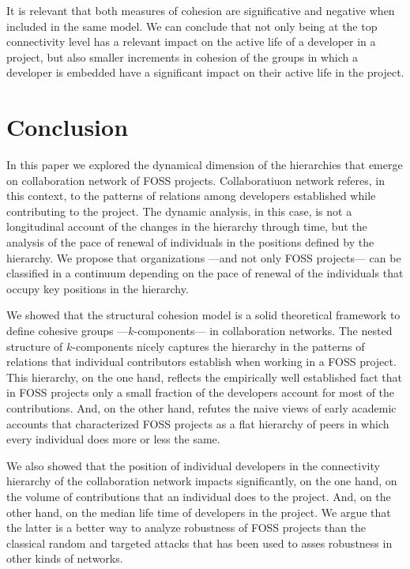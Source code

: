It is relevant that both measures of cohesion are significative and negative when included in the same model. We can conclude that not only being at the top connectivity level has a relevant impact on the active life of a developer in a project, but also smaller increments in cohesion of the groups in which a developer is embedded have a significant impact on their active life in the project.

\section{Conclusion}

In this paper we explored the dynamical dimension of the hierarchies that emerge on collaboration network of FOSS projects. Collaboratiuon network referes, in this context, to the patterns of relations among developers established while contributing to the project. The dynamic analysis, in this case, is not a longitudinal account of the changes in the hierarchy through time, but the analysis of the pace of renewal of individuals in the positions defined by the hierarchy. We propose that organizations ---and not only FOSS projects--- can be classified in a continuum depending on the pace of renewal of the individuals that occupy key positions in the hierarchy.

We showed that the structural cohesion model \citep{white:2001, moody:2003} is a solid theoretical framework to define cohesive groups ---$k$-components--- in collaboration networks. The nested structure of $k$-components nicely captures the hierarchy in the patterns of relations that individual contributors establish when working in a FOSS project. This hierarchy, on the one hand, reflects the empirically well established fact that in FOSS projects only a small fraction of the developers account for most of the contributions. And, on the other hand, refutes the naive views of early academic accounts that characterized FOSS projects as a flat hierarchy of peers in which every individual does more or less the same.

We also showed that the position of individual developers in the connectivity hierarchy of the collaboration network impacts significantly, on the one hand, on the volume of contributions that an individual does to the project. And, on the other hand, on the median life time of developers in the project. We argue that the latter is a better way to analyze robustness of FOSS projects than the classical random and targeted attacks that has been used to asses robustness in other kinds of networks.

